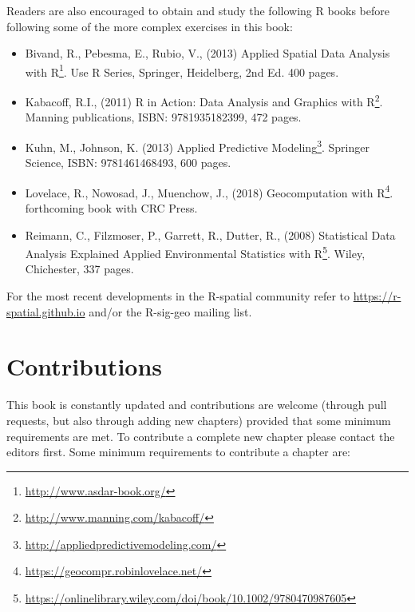 \documentclass[11pt]{krantz}
\renewcommand{\href}[2]{#2\footnote{\url{#1}}}
\theoremstyle{definition}
\theoremstyle{definition}
\theoremstyle{definition}
\theoremstyle{remark}
\begin{document}
Readers are also encouraged to obtain and study the following R books
before following some of the more complex exercises in this book:

\begin{itemize}
\item
  Bivand, R., Pebesma, E., Rubio, V., (2013)
  \href{http://www.asdar-book.org/}{Applied Spatial Data Analysis with
  R}. Use R Series, Springer, Heidelberg, 2nd Ed. 400 pages.
\item
  Kabacoff, R.I., (2011) \href{http://www.manning.com/kabacoff/}{R in
  Action: Data Analysis and Graphics with R}. Manning publications,
  ISBN: 9781935182399, 472 pages.
\item
  Kuhn, M., Johnson, K. (2013)
  \href{http://appliedpredictivemodeling.com/}{Applied Predictive
  Modeling}. Springer Science, ISBN: 9781461468493, 600 pages.
\item
  Lovelace, R., Nowosad, J., Muenchow, J., (2018)
  \href{https://geocompr.robinlovelace.net/}{Geocomputation with R}.
  forthcoming book with CRC Press.
\item
  Reimann, C., Filzmoser, P., Garrett, R., Dutter, R., (2008)
  \href{https://onlinelibrary.wiley.com/doi/book/10.1002/9780470987605}{Statistical
  Data Analysis Explained Applied Environmental Statistics with R}.
  Wiley, Chichester, 337 pages.
\end{itemize}

For the most recent developments in the R-spatial community refer to
\url{https://r-spatial.github.io} and/or the R-sig-geo mailing list.

\hypertarget{contributions}{%
\section*{Contributions}\label{contributions}}


This book is constantly updated and contributions are welcome (through
pull requests, but also through adding new chapters) provided that some
minimum requirements are met. To contribute a complete new chapter
please contact the editors first. Some minimum requirements to
contribute a chapter are:
\end{document}
